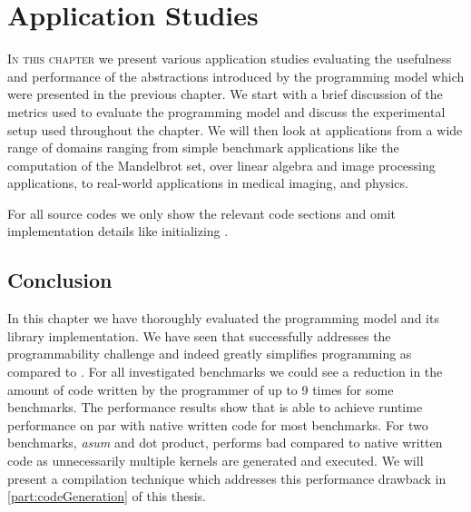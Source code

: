 \chapter{Application Studies}
\label{chapter:skelcl-evaluation}
%
%

\lettrine[lines=3, loversize=0.1]{I}{n this chapter} we present various application studies evaluating the usefulness and performance of the abstractions introduced by the \SkelCL programming model which were presented in the previous chapter.
We start with a brief discussion of the metrics used to evaluate the \SkelCL programming model and discuss the experimental setup used throughout the chapter.
We will then look at applications from a wide range of domains ranging from simple benchmark applications like the computation of the Mandelbrot set, over linear algebra and image processing applications, to real-world applications in medical imaging, and physics.

For all source codes we only show the relevant code sections and omit implementation details like initializing \SkelCL. %















% 

\section{Conclusion}
In this chapter we have thoroughly evaluated the \SkelCL programming model and its \Cpp library implementation.
We have seen that \SkelCL successfully addresses the programmability challenge and indeed greatly simplifies \GPU programming as compared to \OpenCL. 
For all investigated benchmarks we could see a reduction in the amount of code written by the programmer of up to 9 times for some benchmarks.
The performance results show that \SkelCL is able to achieve runtime performance on par with native written \OpenCL code for most benchmarks.
For two benchmarks, \emph{asum} and dot product, \SkelCL performs bad compared to native written code as unnecessarily multiple \OpenCL kernels are generated and executed.
We will present a compilation technique which addresses this performance drawback in \autoref{part:codeGeneration} of this thesis.

